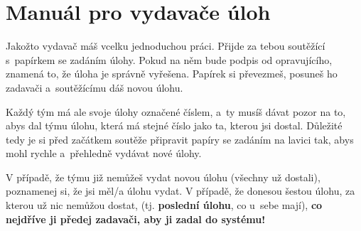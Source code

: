 \documentclass[vyfuk,\classoptions]{fksempty}
\begin{document}
\section{Manuál pro vydavače úloh}

Jakožto vydavač máš vcelku jednoduchou práci. Přijde za tebou 
soutěžící s~papírkem se zadáním úlohy. Pokud na něm bude podpis 
od opravujícího, znamená to, že úloha je správně vyřešena. Papírek si
převezmeš, posuneš ho zadavači a~soutěžícímu dáš novou úlohu.

\medskip

Každý tým má ale svoje úlohy označené 
číslem, a~ty musíš dávat pozor na to, abys dal týmu úlohu, která má 
stejné číslo jako ta, kterou jsi dostal. Důležité tedy je si před začátkem 
soutěže připravit papíry se zadáním na lavici tak, abys mohl rychle 
a~přehledně vydávat nové úlohy. 

V případě, že týmu již nemůžeš vydat novou úlohu (všechny už dostali), poznamenej si, že jsi
měl/a úlohu vydat. V případě, že donesou šestou úlohu, 
za kterou už nic nemůžou dostat, (tj. \textbf{poslední úlohu},
co u~sebe mají), \textbf{co nejdříve ji předej zadavači, aby ji zadal
do systému!}
\end{document}
